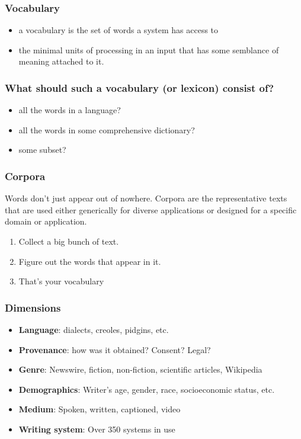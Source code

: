 \documentclass[11pt]{article}
\begin{document}
\subsubsection{Vocabulary}

\begin{itemize}
	\item a vocabulary is the set of words a system has access to
	\item the minimal units of processing in an input that has some semblance of
	      meaning attached to it.
\end{itemize}

\subsubsection*{What should such a vocabulary (or lexicon) consist of?}

\begin{itemize}
	\item all the words in a language?
	\item all the words in some comprehensive dictionary?
	\item some subset?
\end{itemize}

\subsubsection{Corpora}

Words don't just appear out of nowhere. Corpora are the representative texts
that are used either generically for diverse applications or designed for a
specific domain or application.

\begin{enumerate}
	\item Collect a big bunch of text.
	\item Figure out the words that appear in it.
	\item That's your vocabulary
\end{enumerate}

\subsubsection*{Dimensions}

\begin{itemize}
	\item \textbf{Language}: dialects, creoles, pidgins, etc.
	\item \textbf{Provenance}: how was it obtained? Consent? Legal?
	\item \textbf{Genre}: Newswire, fiction, non-fiction, scientific articles,
	      Wikipedia
	\item \textbf{Demographics}: Writer's age, gender, race, socioeconomic status,
	      etc.
	\item \textbf{Medium}: Spoken, written, captioned, video
	\item \textbf{Writing system}: Over 350 systems in use
\end{itemize}
\end{document}
